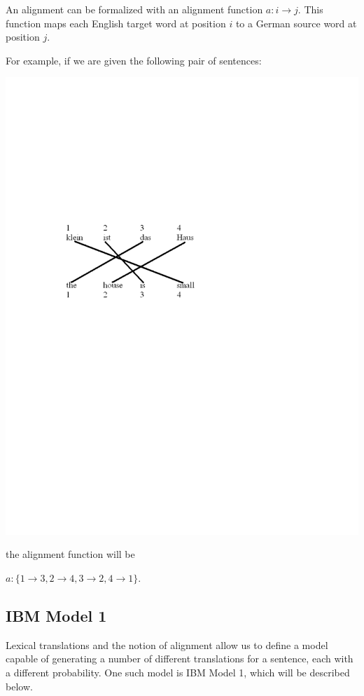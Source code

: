 \documentclass[11pt]{book}
\theoremstyle{plain}
\begin{document}
An alignment can be formalized with an alignment function $a : i
\rightarrow j$. This function maps each English target word at
position $i$ to a German source word at position $j$.

For example, if we are given the following pair of sentences:

\includegraphics[viewport = 100 400 400 550,clip]{constantin-figure2.pdf}

the alignment function will be

$a:\{1 \rightarrow 3, 2 \rightarrow 4, 3 \rightarrow 2, 4
\rightarrow 1\}$.


\subsection{IBM Model 1\\}

Lexical translations and the notion of alignment allow us to define
a model capable of generating a number of different translations for
a sentence, each with a different probability. One such model is IBM
Model 1, which will be described below.
\end{document}
